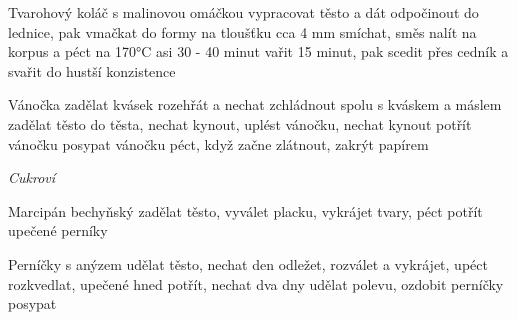 \documentclass[12pt,a4paper]{article}
\begin{document}
\begin{recipe}{Tvarohový koláč s malinovou omáčkou}
   vypracovat těsto a dát odpočinout do lednice, pak vmačkat do formy na tloušťku cca 4 mm
   smíchat, směs nalít na korpus a péct na 170°C asi 30 - 40 minut
   vařit 15 minut, pak scedit přes cedník a svařit do hustší konzistence
\end{recipe}
\newpage

\begin{recipe}{Vánočka}
   zadělat kvásek
   rozehřát a nechat zchládnout
   spolu s kváskem a máslem zadělat těsto
   do těsta, nechat kynout, uplést vánočku, nechat kynout
   potřít vánočku
   posypat vánočku
  \ingredient{} péct, když začne zlátnout, zakrýt papírem
\end{recipe}
\newpage

\vspace*{\fill}
\hfill {\Huge\it Cukroví}\hfill
\vspace*{\fill}
\newpage

\begin{recipe}{Marcipán bechyňský}
   zadělat těsto, vyválet placku, vykrájet tvary, péct
   potřít upečené perníky
\end{recipe}
\newpage

\begin{recipe}{Perníčky s anýzem}
   udělat těsto, nechat den odležet, rozválet a vy\-krá\-jet, upéct
   rozkvedlat, upečené hned potřít, nechat dva dny
   udělat polevu, ozdobit perníčky
   posypat
\end{recipe}
\newpage
\end{document}
